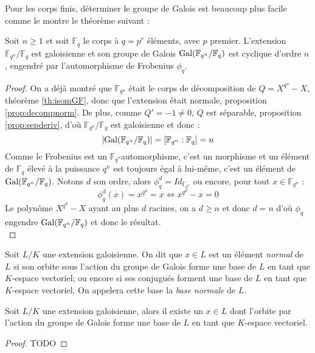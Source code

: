 \documentclass[a4paper]{article} %
\numberwithin{section}{part}
\numberwithin{equation}{section}
\newcommand\GF[1]{\mathbb{F}_{#1}}
\begin{document}
Pour les corps finis, déterminer le groupe de Galois est beaucoup plus facile
comme le montre le théorème suivant :

\begin{thm}
Soit $n\geq1$ et soit $\GF{q}$ le corps à $q=p^r$ éléments, avec $p$ premier.
L'extension $\GF{q^n}/\GF{q}$ est galoisienne et son groupe de Galois
$\textup{Gal}(\GF{q^n}/\GF{q})$ est cyclique d'ordre $n$, engendré par 
l'automorphisme de Frobenius $\phi_q$.
\end{thm}
\begin{proof}
On a déjà montré que $\GF{q^n}$ était le corps de décomposition de $Q = X^{q^n} 
- X$, théorème \ref{th:isomGF}, donc que l'extension était normale, proposition 
\ref{prop:decompnorm}. De plus, comme $Q' = -1 \neq 0$, $Q$ est séparable,
proposition \ref{prop:sepderiv}, d'où $\GF{q^n}/\GF{q}$ est galoisienne
et donc :
\[|\textup{Gal}(\GF{q^n}/\GF{q})| = [\GF{q^n}:\GF{q}] = n\]
Comme le Frobenius est un $\GF{q}$-automorphisme, c'est un morphisme et un 
élément de $\GF{q}$ élevé à la puissance $q^n$ est toujours égal à lui-même, 
c'est un élément de $\textup{Gal}(\GF{q^n}/\GF{q})$. Notons $d$ son ordre, alors
$\phi_q^d = Id_{\GF{q^n}}$ ou encore, pour tout $x\in\GF{q^n}$ :
\[\phi_q^d(x) = x^{q^d} = x \Leftrightarrow x^{q^d} - x = 0\]
Le polynôme $X^{q^d} - X$ ayant au plus $d$ racines, on a $d\geq n$ et donc $d =
n$ d'où $\phi_q$ engendre $\textup{Gal}(\GF{q^n}/\GF{q})$ et donc le
résultat.\\
\end{proof}

\begin{defn}
\label{def:elemnorm}
Soit $L/K$ une extension galoisienne. On dit que $x\in L$ est un élément
\emph{normal} de $L$ si son orbite sous l'action du groupe de Galois forme une 
base de $L$ en tant que $K$-espace vectoriel; ou encore si ses conjugués forment
une base de $L$ en tant que $K$-espace vectoriel. On appelera cette base la 
\emph{base normale} de $L$.
\end{defn}

\begin{thm}
Soit $L/K$ une extension galoisienne, alors il existe un $x\in L$ dont l'orbite
par l'action du groupe de Galois forme une base de $L$ en tant que $K$-espace
vectoriel.
\end{thm}
\begin{proof}
TODO
\end{proof}
\end{document}
